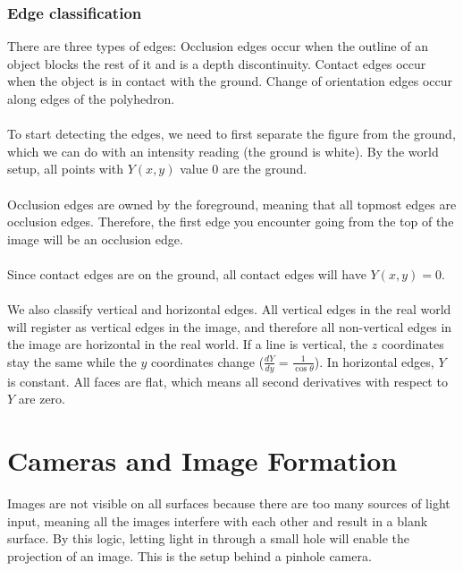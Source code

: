 \documentclass{article}
\begin{document}
\subsubsection*{Edge classification}
There are three types of edges: Occlusion edges occur when the outline of an object blocks the rest of it and is a depth discontinuity. Contact edges occur when the object is in contact with the ground. Change of orientation edges occur along edges of the polyhedron.
\\
\\
To start detecting the edges, we need to first separate the figure from the ground, which we can do with an intensity reading (the ground is white). By the world setup, all points with $Y(x, y)$ value 0 are the ground.
\\
\\
Occlusion edges are owned by the foreground, meaning that all topmost edges are occlusion edges. Therefore, the first edge you encounter going from the top of the image will be an occlusion edge.
\\
\\
Since contact edges are on the ground, all contact edges will have $Y(x, y) = 0$.
\\
\\
We also classify vertical and horizontal edges. All vertical edges in the real world will register as vertical edges in the image, and therefore all non-vertical edges in the image are horizontal in the real world. If a line is vertical, the $z$ coordinates stay the same while the $y$ coordinates change ($\frac{dY}{dy} = \frac{1}{\cos \theta}$). In horizontal edges, $Y$ is constant. All faces are flat, which means all second derivatives with respect to $Y$ are zero.

\section{Cameras and Image Formation}
Images are not visible on all surfaces because there are too many sources of light input, meaning all the images interfere with each other and result in a blank surface. By this logic, letting light in through a small hole will enable the projection of an image. This is the setup behind a pinhole camera.
\end{document}
